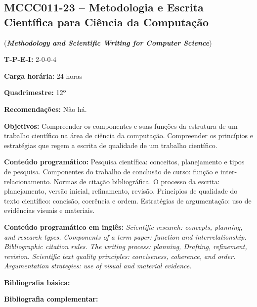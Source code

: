 \documentclass[12pt,a4paper]{article}
\begin{document}
\subsection*{MCCC011-23 -- Metodologia e Escrita Científica para Ciência da Computação}
\label{disc:metod}

(\textbf{\textit{Methodology and Scientific Writing for Computer Science}})

\begin{center}
\begin{minipage}{0.85\textwidth}

    \textbf{T-P-E-I:} 2-0-0-4

    \textbf{Carga horária:} 24 horas
    
    \textbf{Quadrimestre:} 12º
    
    \textbf{Recomendações:} Não há.
    
\end{minipage}
\end{center}

\textbf{Objetivos:}
Compreender os componentes e suas funções da estrutura de um trabalho
científico na área de ciência da computação. 
Compreender os princípios e estratégias que regem a escrita de qualidade de um
trabalho científico.

\textbf{Conteúdo programático:}
Pesquisa científica: conceitos, planejamento e tipos de pesquisa. 
Componentes do trabalho de conclusão de curso: função e inter-relacionamento. 
Normas de citação bibliográfica. 
O processo da escrita: planejamento, versão inicial, refinamento, revisão. 
Princípios de qualidade do texto científico: concisão, coerência e ordem. 
Estratégias de argumentação: uso de evidências visuais e materiais.

\textbf{Conteúdo programático em inglês:}
\textit{Scientific research: concepts, planning, and research types.
Components of a term paper: function and interrelationship.
Bibliographic citation rules.
The writing process: planning, Drafting, refinement, revision.
Scientific text quality principles: conciseness, coherence, and order.
Argumentation strategies: use of visual and material evidence.}

\newrefsection
\textbf{Bibliografia básica:}
\nocite{2007-cervo-bervian, 2010-creswell-creswell, 2010-salomon} 
\printbibliography

\newrefsection
\textbf{Bibliografia complementar:}
\nocite{2015-junior, 2014-wazlawick, 2019-medeiros, 2016-wayne, 2001-rubens}

\printbibliography
\end{document}
